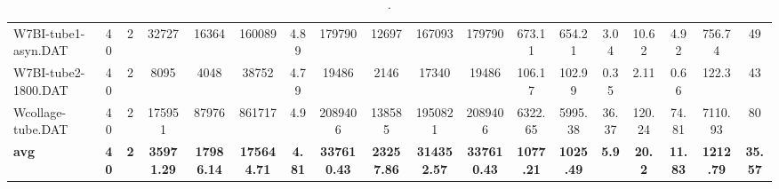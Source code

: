 \begin{sidewaystable}[h]
{\begin{tabular}{lccccccccccccccccc}
W7BI-tube1-asyn.DAT & 40 & 2 & 32727 & 16364 & 160089 & 4.89 & 179790 & 12697 & 167093 & 179790 & 673.11 & 654.21 & 3.04 & 10.62 & 4.92 & 756.74 & 49\\
W7BI-tube2-1800.DAT & 40 & 2 & 8095 & 4048 & 38752 & 4.79 & 19486 & 2146 & 17340 & 19486 & 106.17 & 102.99 & 0.35 & 2.11 & 0.66 & 122.3 & 43\\
Wcollage-tube.DAT & 40 & 2 & 175951 & 87976 & 861717 & 4.9 & 2089406 & 138585 & 1950821 & 2089406 & 6322.65 & 5995.38 & 36.37 & 120.24 & 74.81 & 7110.93 & 80\\
\cline{1-18} \textbf{avg} & \textbf{40} & \textbf{2} & \textbf{35971.29} & \textbf{17986.14} & \textbf{175644.71} & \textbf{4.81} & \textbf{337610.43} & \textbf{23257.86} & \textbf{314352.57} & \textbf{337610.43} & \textbf{1077.21} & \textbf{1025.49} & \textbf{5.9} & \textbf{20.2} & \textbf{11.83} & \textbf{1212.79} & \textbf{35.57} \\ \cline{1-18}
\bottomrule
\end{tabular}%
}%
\caption{.}
\label{tab:table_bc}
\end{sidewaystable}

